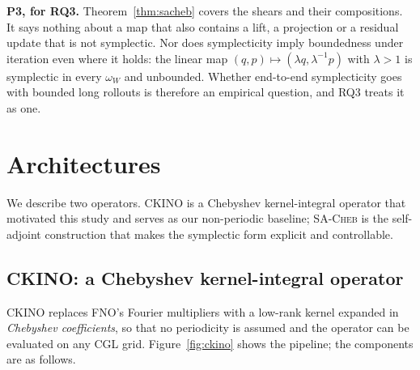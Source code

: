 \documentclass[11pt]{article}
\theoremstyle{definition}
\theoremstyle{remark}
\newcommand{\sacheb}{\textsc{SA-Cheb}}
\newcommand{\ckino}{\textsc{CKINO}}
\begin{document}
\textbf{P3, for RQ3.} Theorem~\ref{thm:sacheb} covers the shears and their
compositions. It says nothing about a map that also contains a lift, a
projection or a residual update that is not symplectic. Nor does symplecticity
imply boundedness under iteration even where it holds: the linear map
$(q,p)\mapsto(\lambda q,\lambda^{-1}p)$ with $\lambda>1$ is symplectic in every
$\omega_W$ and unbounded. Whether end-to-end symplecticity goes with bounded long
rollouts is therefore an empirical question, and RQ3 treats it as one.

\section{Architectures}
\label{sec:arch}

We describe two operators. \ckino{} is a Chebyshev kernel-integral operator that
motivated this study and serves as our non-periodic baseline; \sacheb{} is the
self-adjoint construction that makes the symplectic form explicit and
controllable.

\subsection{\ckino{}: a Chebyshev kernel-integral operator}
\label{sec:ckino}

\ckino{} replaces FNO's Fourier multipliers with a low-rank kernel expanded in
\emph{Chebyshev coefficients}, so that no periodicity is assumed and the operator
can be evaluated on any CGL grid. Figure~\ref{fig:ckino} shows the pipeline; the
components are as follows.
\end{document}
